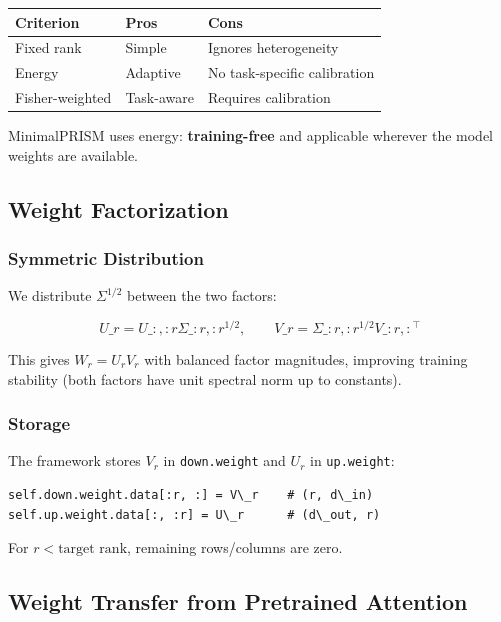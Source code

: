 \begin{table}[H]
\centering
\small
\begin{tabular}{lll}
\toprule
\textbf{Criterion} & \textbf{Pros} & \textbf{Cons} \\
\midrule
Fixed rank & Simple & Ignores heterogeneity \\
Energy & Adaptive & No task-specific calibration \\
Fisher-weighted & Task-aware & Requires calibration \\
\bottomrule
\end{tabular}
\end{table}

MinimalPRISM uses energy: \textbf{training-free} and applicable wherever the 
model weights are available.

\subsection{Weight Factorization}

\subsubsection{Symmetric Distribution}

We distribute $\Sigma^{1/2}$ between the two factors:

\[
U\_r = U\_{:, :r} \Sigma\_{:r, :r}^{1/2}, \qquad
V\_r = \Sigma\_{:r, :r}^{1/2} V\_{:r, :}^\top
\tag{4.6}
\]

This gives $W_r = U_r V_r$ with balanced factor magnitudes, improving 
training stability (both factors have unit spectral norm up to constants).

\subsubsection{Storage}

The framework stores $V_r$ in \texttt{down.weight} and $U_r$ in \texttt{up.weight}:

\begin{lstlisting}
self.down.weight.data[:r, :] = V\_r    # (r, d\_in)
self.up.weight.data[:, :r] = U\_r      # (d\_out, r)
\end{lstlisting}

For $r < \text{target rank}$, remaining rows/columns are zero.

\subsection{Weight Transfer from Pretrained Attention}

